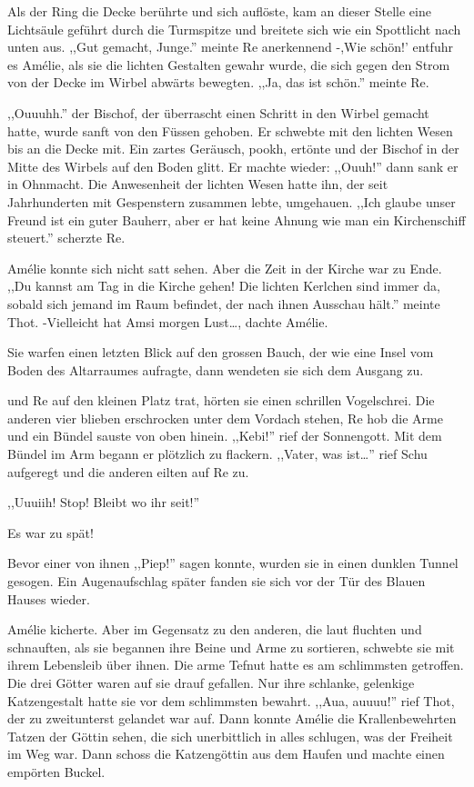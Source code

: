 \documentclass[11pt,titlepage,a5paper]{book}
\begin{document}
Als der Ring die Decke berührte und sich auflöste, kam an dieser Stelle eine Lichtsäule geführt durch die Turmspitze und breitete sich wie ein Spottlicht nach unten aus. ,,Gut gemacht, Junge.'' meinte Re anerkennend -,Wie schön!' entfuhr es Amélie, als sie die lichten Gestalten gewahr wurde, die sich gegen den Strom von der Decke im Wirbel abwärts bewegten. ,,Ja, das ist schön.'' meinte Re.

,,Ouuuhh.'' der Bischof, der überrascht einen Schritt in den Wirbel gemacht hatte, wurde sanft von den Füssen gehoben. Er schwebte mit den lichten Wesen bis an die Decke mit. Ein zartes Geräusch, pookh,  ertönte und der Bischof in der Mitte des Wirbels auf den Boden glitt. Er machte wieder: ,,Ouuh!'' dann sank er in Ohnmacht. Die Anwesenheit der lichten Wesen hatte ihn, der seit Jahrhunderten mit Gespenstern zusammen lebte, umgehauen. ,,Ich glaube unser Freund ist ein guter Bauherr, aber er hat keine Ahnung wie man ein Kirchenschiff steuert.'' scherzte Re.

Amélie konnte sich nicht satt sehen. Aber die Zeit in der Kirche war zu Ende. ,,Du kannst am Tag in die Kirche gehen! Die lichten Kerlchen sind immer da, sobald sich jemand im Raum befindet, der nach ihnen Ausschau hält.'' meinte Thot. -Vielleicht hat Amsi morgen Lust\dots, dachte Amélie.

Sie warfen einen letzten Blick auf den grossen Bauch, der wie eine Insel vom Boden des Altarraumes aufragte, dann wendeten sie sich dem Ausgang zu.

und Re auf den kleinen Platz trat, hörten sie einen schrillen Vogelschrei. Die anderen vier blieben erschrocken unter dem Vordach stehen, Re hob die Arme und ein Bündel sauste von oben hinein. ,,Kebi!'' rief der Sonnengott. Mit dem Bündel im Arm begann er plötzlich zu flackern. ,,Vater, was ist\dots'' rief Schu aufgeregt und die anderen eilten auf Re zu.
\begin{Large},,Uuuiih! Stop! Bleibt wo ihr seit!''\end{Large} Es war zu spät!

Bevor einer von ihnen ,,Piep!'' sagen konnte, wurden sie in einen dunklen Tunnel gesogen. Ein Augenaufschlag später fanden sie sich vor der Tür des Blauen Hauses wieder.

Amélie kicherte. Aber im Gegensatz zu den anderen, die laut fluchten und schnauften,  als sie begannen ihre Beine und Arme zu sortieren, schwebte sie mit ihrem Lebensleib über ihnen. Die arme Tefnut hatte es am schlimmsten getroffen. Die drei Götter waren auf sie drauf gefallen. Nur ihre schlanke, gelenkige Katzengestalt hatte sie vor dem schlimmsten bewahrt. ,,Aua, auuuu!'' rief Thot, der zu zweitunterst gelandet war auf. Dann konnte Amélie die Krallenbewehrten Tatzen der Göttin sehen, die sich unerbittlich in alles schlugen, was der Freiheit im Weg war. Dann schoss die Katzengöttin aus dem Haufen und machte einen empörten Buckel.

\tableofcontents


{}

\end{document}
